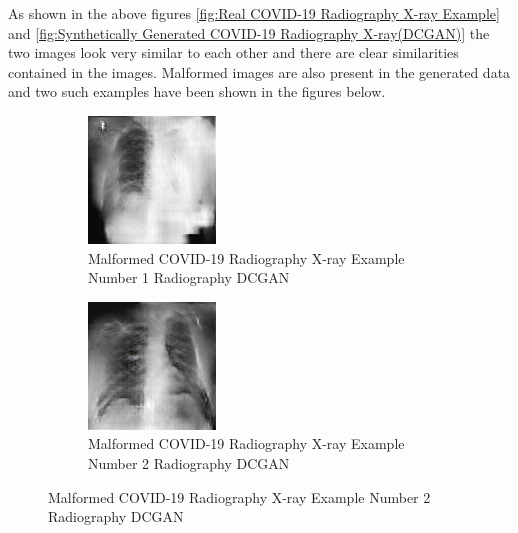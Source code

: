 As shown in the above figures \ref{fig:Real COVID-19 Radiography X-ray Example} and \ref{fig:Synthetically Generated COVID-19 Radiography X-ray(DCGAN)} the two images look very similar to each other and there are clear similarities contained in the images.  Malformed images are also present in the generated data and two such examples have been shown in the figures below.
 \begin{figure}[H]
    \centering
    \begin{subfigure}{.35\textwidth}
    \centering
      \includegraphics[width=.4\linewidth,keepaspectratio]{Images/MalformedCOVID19XrayImageExample1RadiographyDCGAN.png}
      \caption{Malformed COVID-19 Radiography X-ray Example Number 1 Radiography DCGAN}
      \label{fig:Malformed COVID-19 Radiography X-ray Example Number 1 Radiography DCGAN}
    \end{subfigure}\hfill%
    \begin{subfigure}{.35\textwidth}
    \centering
      \includegraphics[width=.4\linewidth,keepaspectratio]{Images/MalformedCOVID19XrayImageExample2RadiographyDCGAN.png}
      \caption{Malformed COVID-19 Radiography X-ray Example Number 2 Radiography DCGAN}
      \label{fig:Malformed COVID-19 Radiography X-ray Example Number 2 Radiography DCGAN}
    \end{subfigure}\hfill%
\end{figure}
